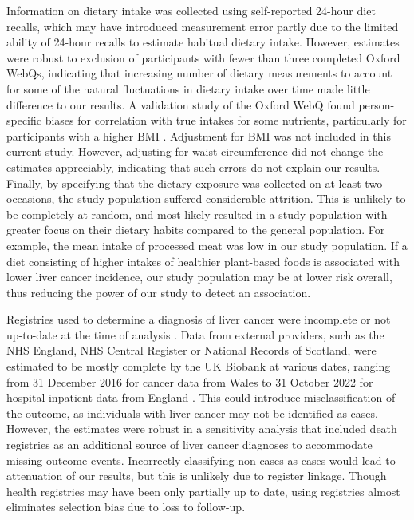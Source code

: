 \documentclass[
]{article}
\begin{document}
Information on dietary intake was collected using self-reported 24-hour
diet recalls, which may have introduced measurement error partly due to
the limited ability of 24-hour recalls to estimate habitual dietary
intake. However, estimates were robust to exclusion of participants with
fewer than three completed Oxford WebQs, indicating that increasing
number of dietary measurements to account for some of the natural
fluctuations in dietary intake over time made little difference to our
results. A validation study of the Oxford WebQ found person-specific
biases for correlation with true intakes for some nutrients,
particularly for participants with a higher BMI \autocite{Greenwood2019}.
Adjustment for BMI was not included in this current study. However,
adjusting for waist circumference did not change the estimates
appreciably, indicating that such errors do not explain our results.
Finally, by specifying that the dietary exposure was collected on at
least two occasions, the study population suffered considerable
attrition. This is unlikely to be completely at random, and most likely
resulted in a study population with greater focus on their dietary
habits compared to the general population. For example, the mean intake
of processed meat was low in our study population. If a diet consisting
of higher intakes of healthier plant-based foods is associated with
lower liver cancer incidence, our study population may be at lower risk
overall, thus reducing the power of our study to detect an association.

Registries used to determine a diagnosis of liver cancer were incomplete
or not up-to-date at the time of analysis \autocite{RN112}. Data from external
providers, such as the NHS England, NHS Central Register or National
Records of Scotland, were estimated to be mostly complete by the UK
Biobank at various dates, ranging from 31 December 2016 for cancer data
from Wales to 31 October 2022 for hospital inpatient data from England
\autocite{RN114}. This could introduce misclassification of the outcome, as
individuals with liver cancer may not be identified as cases. However,
the estimates were robust in a sensitivity analysis that included death
registries as an additional source of liver cancer diagnoses to
accommodate missing outcome events. Incorrectly classifying non-cases as
cases would lead to attenuation of our results, but this is unlikely due
to register linkage. Though health registries may have been only
partially up to date, using registries almost eliminates selection bias
due to loss to follow-up.
\end{document}
